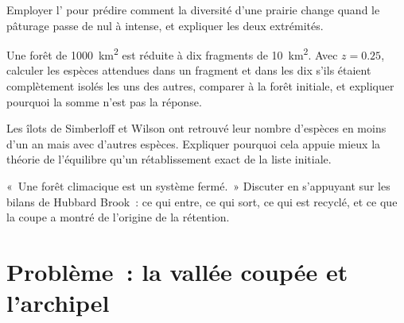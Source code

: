 \begin{exercise}[$\star\star$]\label{exo:b1:ecosystem-dynamics:9}
Employer l' pour prédire
comment la diversité d'une prairie change quand le pâturage passe de
nul à intense, et expliquer les deux extrémités.
\end{exercise}

\begin{exercise}[$\star\star\star$]\label{exo:b1:ecosystem-dynamics:10}
Une forêt de \qty{1000}{km^2} est réduite à dix fragments de
\qty{10}{km^2}. Avec $z = 0.25$, calculer les espèces attendues dans un
fragment et dans les dix s'ils étaient complètement isolés les uns des
autres, comparer à la forêt initiale, et expliquer pourquoi la somme
n'est pas la réponse.
\end{exercise}

\begin{exercise}[$\star\star\star$]\label{exo:b1:ecosystem-dynamics:11}
Les îlots de Simberloff et Wilson ont retrouvé leur nombre d'espèces en
moins d'un an mais avec d'autres espèces. Expliquer pourquoi cela
appuie mieux la théorie de l'équilibre qu'un rétablissement exact de la
liste initiale.
\end{exercise}

\begin{exercise}[$\star\star\star$]\label{exo:b1:ecosystem-dynamics:12}
«~Une forêt climacique est un système fermé.~» Discuter en s'appuyant
sur les bilans de Hubbard Brook~: ce qui entre, ce qui sort, ce qui est
recyclé, et ce que la coupe a montré de l'origine de la rétention.
\end{exercise}

\section{Problème~: la vallée coupée et l'archipel}

